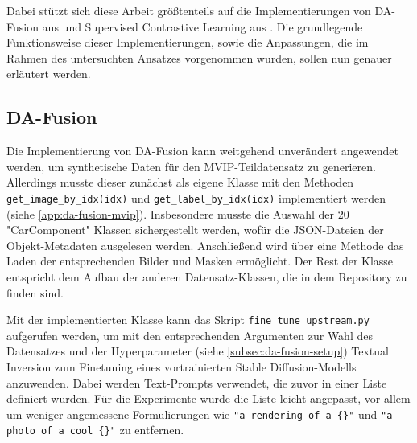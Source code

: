 Dabei stützt sich diese Arbeit größtenteils auf die Implementierungen von DA-Fusion aus \parencite{Trabucco2024dafusiongithub} und Supervised Contrastive Learning aus \parencite{Tian2023supcongithub}. Die grundlegende Funktionsweise dieser Implementierungen, sowie die Anpassungen, die im Rahmen des untersuchten Ansatzes vorgenommen wurden, sollen nun genauer erläutert werden.

\subsection{DA-Fusion} \label{subsec:da-fusion-implementation}

Die Implementierung von DA-Fusion kann weitgehend unverändert angewendet werden, um synthetische Daten für den MVIP-Teildatensatz zu generieren. Allerdings musste dieser zunächst als eigene Klasse mit den Methoden \lstinline{get_image_by_idx(idx)} und \lstinline{get_label_by_idx(idx)} implementiert werden (siehe \autoref{app:da-fusion-mvip}). Insbesondere musste die Auswahl der 20 "CarComponent" Klassen sichergestellt werden, wofür die JSON-Dateien der Objekt-Metadaten ausgelesen werden. Anschließend wird über eine Methode das Laden der entsprechenden Bilder und Masken ermöglicht. Der Rest der Klasse entspricht dem Aufbau der anderen Datensatz-Klassen, die in dem Repository zu finden sind.

Mit der implementierten Klasse kann das Skript \lstinline{fine_tune_upstream.py} aufgerufen werden, um mit den entsprechenden Argumenten zur Wahl des Datensatzes und der Hyperparameter (siehe \autoref{subsec:da-fusion-setup}) Textual Inversion zum Finetuning eines vortrainierten Stable Diffusion-Modells anzuwenden. Dabei werden Text-Prompts verwendet, die zuvor in einer Liste definiert wurden. Für die Experimente wurde die Liste leicht angepasst, vor allem um weniger angemessene Formulierungen wie \lstinline|"a rendering of a {}"| und \lstinline|"a photo of a cool {}"| zu entfernen.

